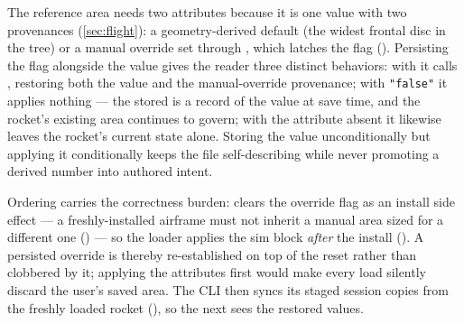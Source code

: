 The reference area needs two attributes because it is one value with two provenances
(\cref{sec:flight}): a geometry-derived default (the widest frontal disc in the tree) or
a manual override set through , which latches the
 flag (). Persisting the
flag alongside the value gives the reader three distinct behaviors: with
 it calls , restoring both
the value and the manual-override provenance; with \texttt{"false"} it applies nothing
--- the stored  is a record of the value at save time, and the
rocket's existing area continues to govern; with the attribute absent it likewise leaves the
rocket's current state alone. Storing the value unconditionally but applying it
conditionally keeps the file self-describing while never promoting a derived number into
authored intent.

Ordering carries the correctness burden:  clears the override flag as
an install side effect --- a freshly-installed airframe must not inherit a manual area
sized for a different one () --- so the loader
applies the sim block \emph{after} the install ().
A persisted override is thereby re-established on top of the reset rather than clobbered
by it; applying the attributes first would make every load silently discard the user's
saved area. The CLI then syncs its staged session copies from the freshly loaded rocket
(), so the next  sees the restored values.
